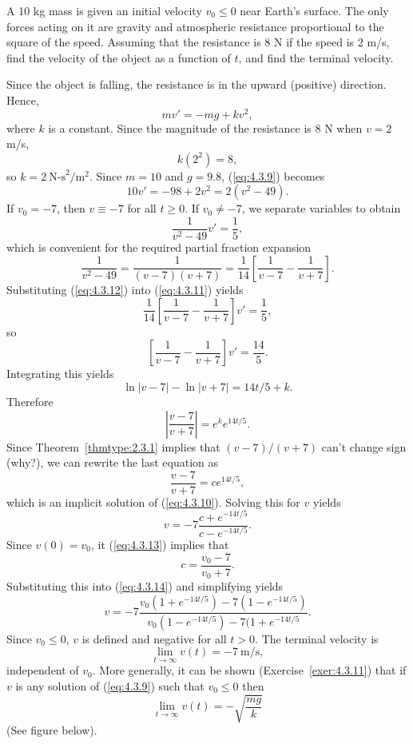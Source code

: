 \documentclass{ximera}
\begin{document}
\begin{example}\label{example:4.3.3}
A 10 kg mass is given an initial velocity $v_0\leq 0$
 near Earth's surface. The only forces acting on it are
gravity and atmospheric resistance proportional to the square of the
speed. Assuming that the resistance is 8 N if the speed is 2 m/s,
find the velocity of the object as a function of $t$, and
find the terminal velocity.
 
\begin{explanation} Since the object is falling, the resistance is in the upward
(positive) direction. Hence,
\begin{equation} \label{eq:4.3.9}
mv'=-mg+kv^2,
\end{equation}
where $k$ is a constant. Since the magnitude of the resistance is 8 N
when $v=2$ m/s,
$$
k(2^2)=8,
$$
 so $k=2\  \mbox{N-s}^2/\mbox{m}^2$.  Since
$m=10$ and $g=9.8$, (\ref{eq:4.3.9}) becomes
\begin{equation} \label{eq:4.3.10}
10v'=-98+2v^2=2(v^2-49).
\end{equation}
If $v_0=-7$, then $v\equiv-7$ for all $t\geq 0$. If $v_0\neq -7$,
we separate  variables to obtain
\begin{equation} \label{eq:4.3.11}
\frac{1}{v^2-49}v'=\frac{1}{5},
\end{equation}
which is convenient for the required partial fraction expansion
\begin{equation} \label{eq:4.3.12}
\frac{1}{v^2-49} =\frac{1}{(v-7)(v+7)}
=\frac{1}{14}\left[\frac{1}{v-7}
-\frac{1}{v+7}\right].
\end{equation}
 Substituting (\ref{eq:4.3.12})  into (\ref{eq:4.3.11}) yields
$$
\frac{1}{14}\left[\frac{1}{v-7}-\frac{1}{v+7}\right]v'=\frac{1}{5},
$$
 so
$$
\left[\frac{1}{v-7}-\frac{1}{v+7}\right]v'=\frac{14}{5}.
$$
Integrating this yields
$$
\ln |v-7|-\ln|v+7|=14t/5+k.
$$
Therefore
$$
\left|\frac{v-7}{v+7}\right|=e^ke^{14t/5}.
$$
Since  Theorem~\ref{thmtype:2.3.1}  implies  that  $(v-7)/(v+7)$   can't
change sign (why?), we can rewrite the last equation as
 \begin{equation} \label{eq:4.3.13}
 \frac{v-7}{v+7}=ce^{14t/5},
\end{equation}
which is an implicit solution of (\ref{eq:4.3.10}).
Solving this for $v$ yields
\begin{equation} \label{eq:4.3.14}
v=-7\frac{c+e^{-14t/5}}{c-e^{-14t/5}}.
\end{equation}
 Since $v(0)=v_0$, it
 (\ref{eq:4.3.13}) implies that
$$
c=\frac{v_0-7}{v_0+7}.
$$
 Substituting this into (\ref{eq:4.3.14}) and simplifying yields
$$
v=-7\frac{v_0(1+e^{-14t/5})-7(1-e^{-14t/5})}{v_0(1-e^{-14t/5})-7(1+e^{-14t/5}}.
$$
Since $v_0\leq 0$, $v$ is defined and negative for all
$t>0$. The terminal velocity is
$$
\lim_{t\to\infty} v(t)=-7\  \mbox{m/s},
$$
independent of $v_0$. More generally, it
can be shown (Exercise~\ref{exer:4.3.11}) that if $v$ is any solution
of (\ref{eq:4.3.9}) such that $v_0\leq 0$ then
$$
\lim_{t\to\infty}v(t)=-\sqrt{\frac{mg}{k}}
$$
(See figure below).
 

\end{explanation}
\end{example}
\end{document}
